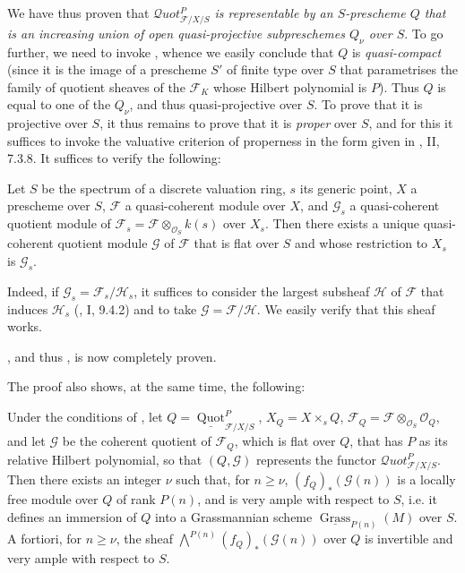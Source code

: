 We have thus proven that \emph{$\mathcal{Q}uot_{\mathcal{F}/X/S}^P$ is representable by an $S$-prescheme $Q$ that is an increasing union of open quasi-projective subpreschemes $Q_\nu$ over $S$}.
To go further, we need to invoke , whence we easily conclude that $Q$ is \emph{quasi-compact} (since it is the image of a prescheme $S'$ of finite type over $S$ that parametrises the family of quotient sheaves of the $\mathcal{F}_K$ whose Hilbert polynomial is $P$).
Thus $Q$ is equal to one of the $Q_\nu$, and thus quasi-projective over $S$.
To prove that it is projective over $S$, it thus remains to prove that it is \emph{proper} over $S$, and for this it suffices to invoke the valuative criterion of properness in the form given in \cite{GD1960}, II, 7.3.8.
It suffices to verify the following:


\begin{lemma}\label{fga3.iv-3-lemma-3.7}
  Let $S$ be the spectrum of a discrete valuation ring, $s$ its generic point, $X$ a prescheme over $S$, $\mathcal{F}$ a quasi-coherent module over $X$, and $\mathcal{G}_s$ a quasi-coherent quotient module of $\mathcal{F}_s=\mathcal{F}\otimes_{\mathcal{O}_S} k(s)$ over $X_s$.
  Then there exists a unique quasi-coherent quotient module $\mathcal{G}$ of $\mathcal{F}$ that is flat over $S$ and whose restriction to $X_s$ is $\mathcal{G}_s$.
\end{lemma}

\begin{cproof}
  Indeed, if $\mathcal{G}_s=\mathcal{F}_s/\mathcal{H}_s$, it suffices to consider the largest subsheaf $\mathcal{H}$ of $\mathcal{F}$ that induces $\mathcal{H}_s$ (\cite{GD1960}, I, 9.4.2) and to take $\mathcal{G}=\mathcal{F}/\mathcal{H}$.
  We easily verify that this sheaf works.
\end{cproof}


, and thus , is now completely proven.

The proof also shows, at the same time, the following:


\begin{proposition}\label{fga3.iv-3-proposition-3.8}
  Under the conditions of , let $Q=\underline{\operatorname{Quot}}_{\mathcal{F}/X/S}^P$, $X_Q=X\times_s Q$, $\mathcal{F}_Q=\mathcal{F}\otimes_{\mathcal{O}_S}\mathcal{O}_Q$, and let $\mathcal{G}$ be the coherent quotient of $\mathcal{F}_Q$, which is flat over $Q$, that has $P$ as its relative Hilbert polynomial, so that $(Q,\mathcal{G})$ represents the functor $\mathcal{Q}uot_{\mathcal{F}/X/S}^P$.
  Then there exists an integer $\nu$ such that, for $n\geqslant\nu$, $(f_Q)_*(\mathcal{G} (n))$ is a locally free module over $Q$ of rank $P(n)$, and is very ample with respect to $S$, i.e. it defines an immersion of $Q$ into a Grassmannian scheme $\underline{\operatorname{Grass}}_{P(n)} (M)$ over $S$.
  A fortiori, for $n\geqslant\nu$, the sheaf $\bigwedge^{P(n)} (f_Q)_*(\mathcal{G} (n))$ over $Q$ is invertible and very ample with respect to $S$.
\end{proposition}

